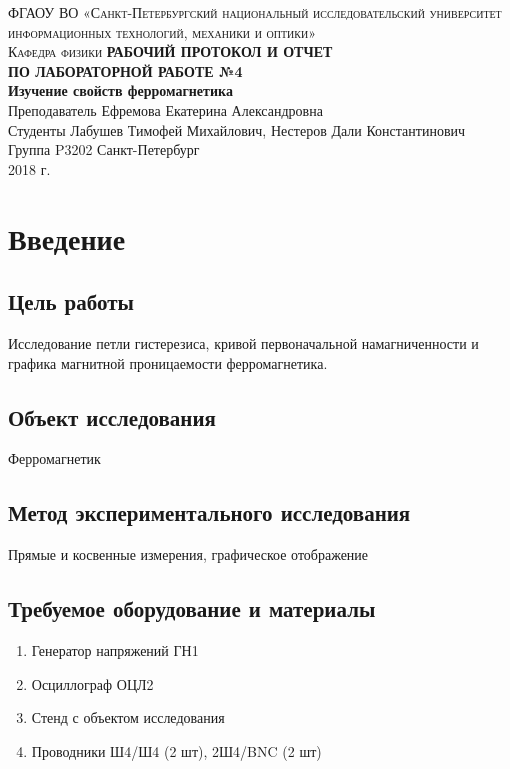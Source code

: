 \documentclass[12pt, a4paper]{article}
\begin{document}
\begin{titlepage}

\noindent\textsc{ФГАОУ ВО «Санкт-Петербургский национальный исследовательский
университет информационных технологий, механики и оптики»\\[4mm]
Кафедра физики}
\vfill
\noindent\textbf{РАБОЧИЙ ПРОТОКОЛ И ОТЧЕТ\\[2mm]
ПО ЛАБОРАТОРНОЙ РАБОТЕ №4\\[4mm]
Изучение свойств ферромагнетика}\\[16mm]
Преподаватель Ефремова Екатерина Александровна\\[2mm]
Студенты Лабушев Тимофей Михайлович, Нестеров Дали Константинович\\[2mm]
Группа P3202
\vfill
\noindent Санкт-Петербург\\[2mm]
2018 г.

\end{titlepage}

\section*{Введение}

\subsection*{Цель работы}

Исследование петли гистерезиса, кривой первоначальной намагниченности
и графика магнитной проницаемости ферромагнетика.

\subsection*{Объект исследования}

Ферромагнетик

\subsection*{Метод экспериментального исследования}

Прямые и косвенные измерения, графическое отображение

\subsection*{Требуемое оборудование и материалы}

\begin{enumerate}
\item Генератор напряжений ГН1
\item Осциллограф ОЦЛ2
\item Стенд с объектом исследования
\item Проводники Ш4/Ш4 (2 шт), 2Ш4/BNC (2 шт)
\end{enumerate}
\end{document}

